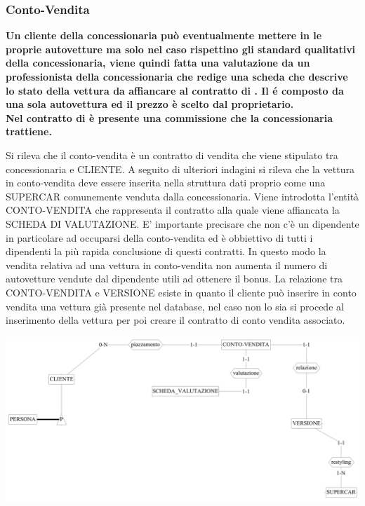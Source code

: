 \documentclass[11pt]{article}
\begin{document}
\subsubsection{Conto-Vendita}
\textbf{Un cliente della concessionaria può eventualmente mettere in
 le proprie autovetture ma solo nel caso rispettino
gli standard qualitativi della concessionaria, viene quindi fatta una
valutazione da un professionista della concessionaria che redige una scheda che
descrive lo stato della vettura da affiancare al contratto di
. Il  é composto da una
sola autovettura ed il prezzo è scelto dal proprietario.\\ 
Nel contratto di  è presente una commissione che la
concessionaria trattiene.}

Si rileva che il conto-vendita è un contratto di vendita che viene stipulato tra
concessionaria e CLIENTE. A seguito di ulteriori indagini si rileva che la
vettura in conto-vendita deve essere inserita nella struttura dati proprio come
una SUPERCAR comunemente venduta dalla concessionaria. Viene introdotta l'entità
CONTO-VENDITA che rappresenta il contratto alla quale viene affiancata la SCHEDA
DI VALUTAZIONE. E' importante precisare che non c’è un dipendente in particolare
ad occuparsi della conto-vendita ed è obbiettivo di tutti i dipendenti la più
rapida conclusione di questi contratti. In questo modo la vendita relativa ad
una vettura in conto-vendita non aumenta il numero di autovetture vendute dal
dipendente utili ad ottenere il bonus. La relazione tra CONTO-VENDITA e VERSIONE
esiste in quanto il cliente può inserire in conto vendita una vettura già
presente nel database, nel caso non lo sia si procede al inserimento della
vettura per poi creare il contratto di conto vendita associato.

\begin{center}
    \includegraphics[width=\linewidth]{images/partialSchemes/contoVendita.png}
\end{center}
\end{document}
